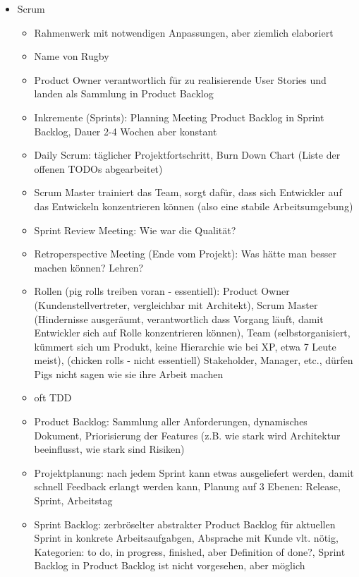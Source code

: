 \documentclass[paper=a4, fontsize=11pt]{scrartcl} %
\numberwithin{equation}{section} %
\numberwithin{figure}{section} %
\numberwithin{table}{section} %
\begin{document}
\begin{itemize}
\begin{itemize}
\begin{minipage}{.5\textwidth}
    \end{minipage}
  \end{itemize}
  \item Scrum
  \begin{itemize}
    \item Rahmenwerk mit notwendigen Anpassungen, aber ziemlich elaboriert
    \item Name von Rugby
    \item Product Owner verantwortlich für zu realisierende User Stories und landen als Sammlung in Product Backlog
    \item Inkremente (Sprints): Planning Meeting Product Backlog in Sprint Backlog, Dauer 2-4 Wochen aber konstant
    \item Daily Scrum: täglicher Projektfortschritt, Burn Down Chart (Liste der offenen TODOs abgearbeitet)
    \item Scrum Master trainiert das Team, sorgt dafür, dass sich Entwickler auf das Entwickeln konzentrieren können (also eine stabile Arbeitsumgebung)
    \item Sprint Review Meeting: Wie war die Qualität?
    \item Retroperspective Meeting (Ende vom Projekt): Was hätte man besser machen können? Lehren?
    \item Rollen (pig rolls treiben voran - essentiell): Product Owner (Kundenstellvertreter, vergleichbar mit Architekt), Scrum Master (Hindernisse ausgeräumt, verantwortlich dass Vorgang läuft, damit Entwickler sich auf Rolle konzentrieren können), Team (selbstorganisiert, kümmert sich um Produkt, keine Hierarchie wie bei XP, etwa 7 Leute meist), (chicken rolls - nicht essentiell) Stakeholder, Manager, etc., dürfen Pigs nicht sagen wie sie ihre Arbeit machen
    \item oft TDD
    \item Product Backlog: Sammlung aller Anforderungen, dynamisches Dokument, Priorisierung der Features (z.B. wie stark wird Architektur beeinflusst, wie stark sind Risiken)
    \item Projektplanung: nach jedem Sprint kann etwas ausgeliefert werden, damit schnell Feedback erlangt werden kann, Planung auf 3 Ebenen: Release, Sprint, Arbeitstag
    \item Sprint Backlog: zerbröselter abstrakter Product Backlog für aktuellen Sprint in konkrete Arbeitsaufgabgen, Absprache mit Kunde vlt. nötig, Kategorien: to do, in progress, finished, aber Definition of done?, Sprint Backlog in Product Backlog ist nicht vorgesehen, aber möglich

\end{itemize}
\end{itemize}
\end{document}
